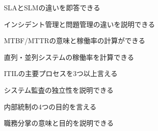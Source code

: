 \begin{tatsaku}
  \item SLAとSLMの違いを即答できる
  \item インシデント管理と問題管理の違いを説明できる
  \item MTBF/MTTRの意味と稼働率の計算ができる
  \item 直列・並列システムの稼働率を計算できる
  \item ITILの主要プロセスを3つ以上言える
  \item システム監査の独立性を説明できる
  \item 内部統制の4つの目的を言える
  \item 職務分掌の意味と目的を説明できる
\end{tatsaku}

